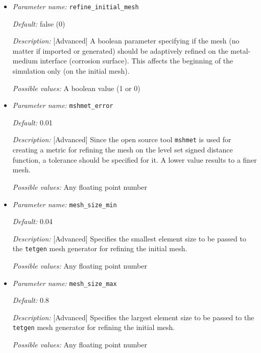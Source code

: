 \begin{itemize}
{\it Possible values:} Any positive integer number 


\item {\it Parameter name:} {\tt refine\_initial\_mesh}
\label{parameters:refine_initial_mesh}


{\it Default:} false (0)

{\it Description:} [Advanced] A boolean parameter specifying if the mesh (no matter if imported or generated) should be adaptively refined on the metal-medium interface (corrosion surface). This affects the beginning of the simulation only (on the initial mesh).

{\it Possible values:} A boolean value (1 or 0)


\item {\it Parameter name:} {\tt mshmet\_error}
\label{parameters:mshmet_error}


{\it Default:} 0.01

{\it Description:} [Advanced] Since the open source tool {\tt mshmet} is used for creating a metric for refining the mesh on the level set signed distance function, a tolerance should be specified for it. A lower value results to a finer mesh.

{\it Possible values:} Any floating point number


\item {\it Parameter name:} {\tt mesh\_size\_min}
\label{parameters:mesh_size_min}


{\it Default:} 0.04

{\it Description:} [Advanced] Specifies the smallest element size to be passed to the {\tt tetgen} mesh generator for refining the initial mesh.

{\it Possible values:} Any floating point number


\item {\it Parameter name:} {\tt mesh\_size\_max}
\label{parameters:mesh_size_max}


{\it Default:} 0.8

{\it Description:} [Advanced] Specifies the largest element size to be passed to the {\tt tetgen} mesh generator for refining the initial mesh.

{\it Possible values:} Any floating point number

\end{itemize}



